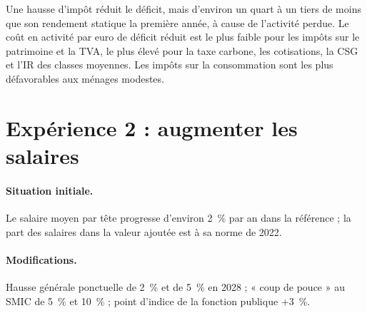 \begin{resultat}
Une hausse d'impôt réduit le déficit, mais d'environ un quart à un tiers de moins que son rendement statique la
première année, à cause de l'activité perdue. Le coût en activité par euro de déficit réduit est le plus faible pour les
impôts sur le patrimoine et la TVA, le plus élevé pour la taxe carbone, les cotisations, la CSG et l'IR des classes
moyennes. Les impôts sur la consommation sont les plus défavorables aux ménages modestes.
\end{resultat}

\section{Expérience 2 : augmenter les salaires}
\label{sec:exp2}

\paragraph{Situation initiale.} Le salaire moyen par tête progresse d'environ 2~\% par an dans la référence ; la part des
salaires dans la valeur ajoutée est à sa norme de 2022.

\paragraph{Modifications.} Hausse générale ponctuelle de 2~\% et de 5~\% en 2028 ; « coup de pouce » au SMIC de 5~\% et
10~\% ; point d'indice de la fonction publique +3~\%.

